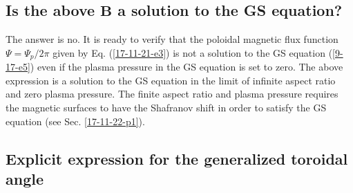 \documentclass{llncs}
\begin{document}
\subsection{Is the above $\mathbf{B}$ a solution to the GS equation?}

The answer is no. It is ready to verify that the poloidal magnetic flux
function $\Psi = \Psi_p / 2 \pi$ given by Eq. (\ref{17-11-21-e3}) is not a
solution to the GS equation (\ref{9-17-e5}) even if the plasma pressure in the
GS equation is set to zero. The above expression is a solution to the GS
equation in the limit of infinite aspect ratio and zero plasma pressure. The
finite aspect ratio and plasma pressure requires the magnetic surfaces to have
the Shafranov shift in order to satisfy the GS equation (see Sec.
\ref{17-11-22-p1}).

\subsection{Explicit expression for the generalized toroidal angle}
\end{document}
